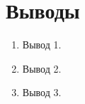 \section{Выводы}
	\begin{enumerate}
		\item Вывод 1.
		\item Вывод 2.
		\item Вывод 3.
	\end{enumerate}